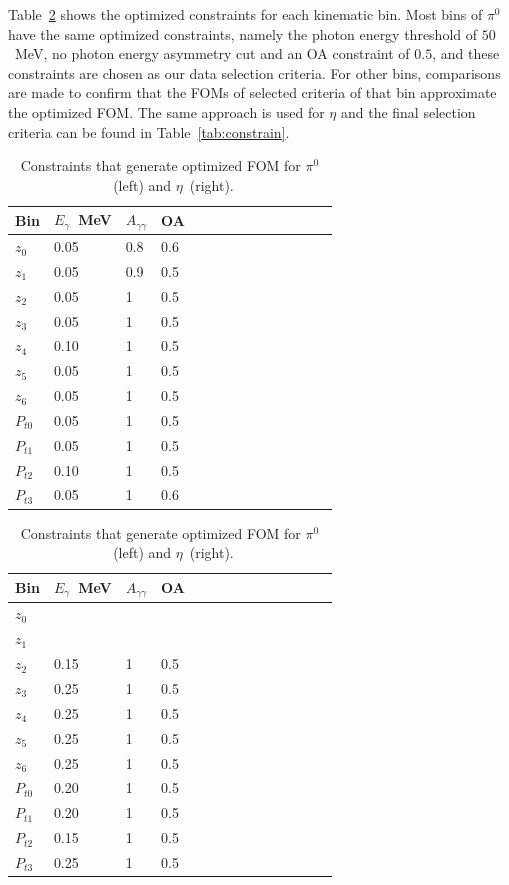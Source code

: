 Table~\ref{tab:FOM} shows the optimized constraints for each kinematic bin. Most bins of $\pi^0$ have the same optimized constraints, namely the photon energy threshold of $50$~MeV, no photon energy asymmetry cut and an OA constraint of $0.5$, and these constraints are chosen as our data selection criteria. For other bins, comparisons are made to confirm that the FOMs of selected criteria of that bin approximate the optimized FOM. The same approach is used for $\eta$ and the final selection criteria can be found in Table~\ref{tab:constrain}.%
\begin{table}[H]
\begin{tabular}{|p{1.3cm}|l|l|l|l|l|l|l|l|l|l|l|l|l|}
\hline
Bin & $E_{\gamma}$~MeV & $A_{\gamma\gamma}$ & OA \\ \hline
$z_0$ & 0.05 & 0.8 & 0.6 \\\hline
$z_1$ & 0.05 & 0.9 & 0.5 \\\hline
$z_2$ & 0.05 & 1 & 0.5 \\\hline
$z_3$ & 0.05 & 1 & 0.5 \\\hline
$z_4$ & 0.10 & 1 & 0.5 \\\hline
$z_5$ & 0.05 & 1 & 0.5 \\\hline
$z_6$ & 0.05 & 1 & 0.5 \\\hline
$P_{t0}$ & 0.05 & 1 & 0.5 \\\hline
$P_{t1}$ & 0.05 & 1 & 0.5 \\\hline
$P_{t2}$ & 0.10 & 1 & 0.5 \\\hline
$P_{t3}$ & 0.05 & 1 & 0.6 \\\hline
\end{tabular}
\quad
\begin{tabular}{|p{1.3cm}|l|l|l|l|l|l|l|l|l|l|l|l|l|}
\hline
Bin & $E_{\gamma}$~MeV & $A_{\gamma\gamma}$ & OA \\ \hline
$z_0$ &  &  &  \\\hline
$z_1$ &  &  &  \\\hline
$z_2$ & 0.15 & 1 & 0.5 \\\hline
$z_3$ & 0.25 & 1 & 0.5 \\\hline
$z_4$ & 0.25 & 1 & 0.5 \\\hline
$z_5$ & 0.25 & 1 & 0.5 \\\hline
$z_6$ & 0.25 & 1 & 0.5 \\\hline
$P_{t0}$ & 0.20 & 1 & 0.5 \\\hline
$P_{t1}$ & 0.20 & 1 & 0.5 \\\hline
$P_{t2}$ & 0.15 & 1 & 0.5 \\\hline
$P_{t3}$ & 0.25 & 1 & 0.5 \\\hline
\end{tabular}
\caption{Constraints that generate optimized FOM for $\pi^0$~(left) and $\eta$~(right).}
\label{tab:FOM}
\end{table}


